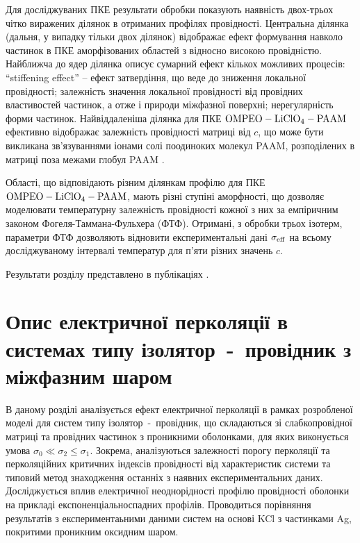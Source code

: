 \documentclass[14pt,twoside]{vakthesis}
\begin{document}
Для досліджуваних ПКЕ результати обробки показують наявність двох-трьох чітко виражених ділянок в отриманих профілях провідності. Центральна ділянка (дальня, у випадку тільки двох ділянок) відображає ефект формування навколо частинок в ПКЕ аморфізованих областей з відносно високою провідністю. 
Найближча до ядер ділянка описує сумарний ефект кількох можливих процесів: ``stiffening effect'' -- ефект затвердіння, що веде до зниження локальної провідності; залежність значення локальної провідності від провідних властивостей частинок, а отже і природи міжфазної поверхні; нерегулярність форми частинок.
Найвіддаленіша ділянка для ПКЕ $\rm OMPEO-LiClO_4-PAAM$ ефективно відображає залежність провідності матриці від $c$, що може бути викликана зв'язуваннями іонами солі поодиноких молекул PAAM, розподілених в матриці поза межами глобул PAAM \cite{Wiec1994}.

Області, що відповідають різним ділянкам профілю для ПКЕ $\rm OMPEO-LiClO_4-PAAM$, мають різні ступіні аморфності, що дозволяє моделювати температурну залежність провідності кожної з них за емпіричним законом Фогеля-Таммана-Фульхера (ФТФ). Отримані, з обробки трьох ізотерм, параметри ФТФ дозволяють відновити експериментальні дані $\sigma_{\rm eff}$ на всьому досліджуваному інтервалі температур для п'яти різних значень $c$.

Результати розділу представлено в публікаціях \cite{Sushko2018JML, Sushko2018PRE}.


\chapter{Опис електричної перколяції в системах типу ізо\-лятор~-~провідник з міжфазним шаром}\label{sec:simple-composites}

В даному розділі аналізується ефект електричної перколяції в рамках розробленої моделі для  систем типу ізолятор~-~провідник, що складаються зі слабкопровідної матриці та провідних частинок з проникними оболонками, для яких виконується умова $\sigma_0 \ll \sigma_2 \leq \sigma_1$. Зокрема, аналізуються залежності порогу перколяції та перколяційних критичних індексів провідності від характеристик системи та типовий метод знаходження останніх з наявних експериментальних даних. Досліджується вплив електричної неоднорідності профілю провідності оболонки на прикладі експоненціальноспадних профілів. Проводиться порівняння результатів з експериментаьними даними систем на основі KCl з частинками Ag, покритими проникним оксидним шаром.
\end{document}
